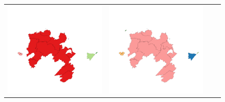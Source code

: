 \begin{figure}
\begin{tabularx}{1\textwidth}{XXXX}
\includegraphics[width=1\linewidth]{images/ch6/contig/09}&
\includegraphics[width=1\linewidth]{images/ch6/contig/10}&

\end{tabularx}
\end{figure}
